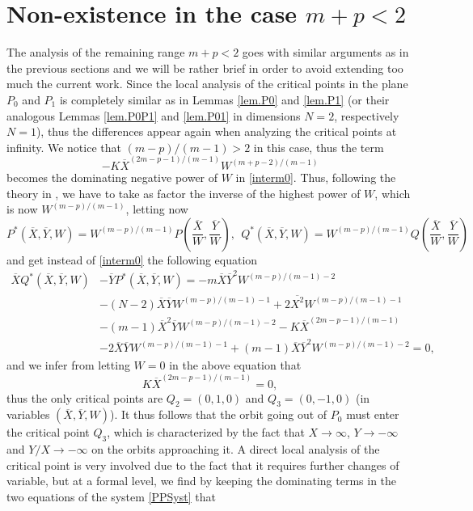 \documentclass[a4paper,11pt]{article}
\numberwithin{equation}{section}
\begin{document}
\section{Non-existence in the case $m+p<2$}\label{sec.lower}

The analysis of the remaining range $m+p<2$ goes with similar arguments as in the previous sections and we will be rather brief in order to avoid extending too much the current work. Since the local analysis of the critical points in the plane $P_0$ and $P_1$ is completely similar as in Lemmas \ref{lem.P0} and \ref{lem.P1} (or their analogous Lemmas \ref{lem.P0P1} and \ref{lem.P01} in dimensions $N=2$, respectively $N=1$), thus the differences appear again when analyzing the critical points at infinity. We notice that $(m-p)/(m-1)>2$ in this case, thus the term
$$
-K\overline{X}^{(2m-p-1)/(m-1)}W^{(m+p-2)/(m-1)}
$$
becomes the dominating negative power of $W$ in \eqref{interm0}. Thus, following the theory in \cite[Section 3.10]{Pe}, we have to take as factor the inverse of the highest power of $W$, which is now $W^{(m-p)/(m-1)}$, letting now
$$
P^*(\overline{X},\overline{Y},W)=W^{(m-p)/(m-1)}P\left(\frac{\overline{X}}{W},\frac{\overline{Y}}{W}\right), \ \  Q^*(\overline{X},\overline{Y},W)=W^{(m-p)/(m-1)}Q\left(\frac{\overline{X}}{W},\frac{\overline{Y}}{W}\right)
$$
and get instead of \eqref{interm0} the following equation
\begin{equation*}\label{interm0bis}
\begin{split}
\overline{X}Q^*(\overline{X},\overline{Y},W)&-\overline{Y}P^*(\overline{X},\overline{Y},W)=-m\overline{X}\overline{Y}^2W^{(m-p)/(m-1)-2}\\
&-(N-2)\overline{X}\overline{Y}W^{(m-p)/(m-1)-1}+2\overline{X^2}W^{(m-p)/(m-1)-1}\\
&-(m-1)\overline{X}^2\overline{Y}W^{(m-p)/(m-1)-2}-K\overline{X}^{(2m-p-1)/(m-1)}\\
&-2\overline{X}\overline{Y}W^{(m-p)/(m-1)-1}+(m-1)\overline{X}\overline{Y}^2W^{(m-p)/(m-1)-2}=0,
\end{split}
\end{equation*}
and we infer from letting $W=0$ in the above equation that
$$
K\overline{X}^{(2m-p-1)/(m-1)}=0,
$$
thus the only critical points are $Q_2=(0,1,0)$ and $Q_3=(0,-1,0)$ (in variables $(\overline{X},\overline{Y},W)$). It thus follows that the orbit going out of $P_0$ must enter the critical point $Q_3$, which is characterized by the fact that $X\to\infty$, $Y\to-\infty$ and $Y/X\to-\infty$ on the orbits approaching it. A direct local analysis of the critical point is very involved due to the fact that it requires further changes of variable, but at a formal level, we find by keeping the dominating terms in the two equations of the system \eqref{PPSyst} that
\end{document}
